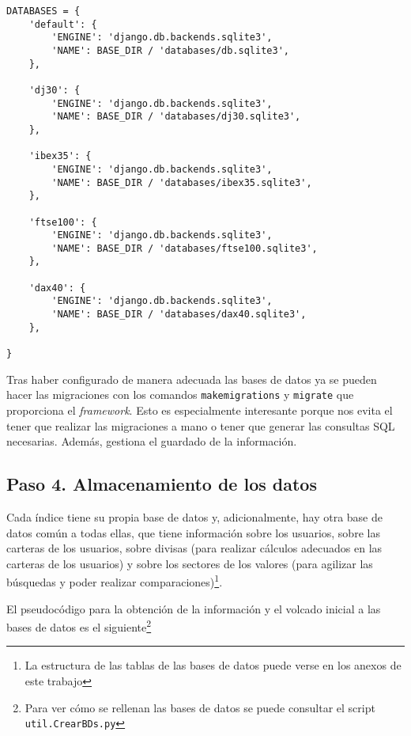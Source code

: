 \begin{verbatim}
DATABASES = {
    'default': {
        'ENGINE': 'django.db.backends.sqlite3',
        'NAME': BASE_DIR / 'databases/db.sqlite3',
    },

    'dj30': {
        'ENGINE': 'django.db.backends.sqlite3',
        'NAME': BASE_DIR / 'databases/dj30.sqlite3',
    },

    'ibex35': {
        'ENGINE': 'django.db.backends.sqlite3',
        'NAME': BASE_DIR / 'databases/ibex35.sqlite3',
    },

    'ftse100': {
        'ENGINE': 'django.db.backends.sqlite3',
        'NAME': BASE_DIR / 'databases/ftse100.sqlite3',
    },

    'dax40': {
        'ENGINE': 'django.db.backends.sqlite3',
        'NAME': BASE_DIR / 'databases/dax40.sqlite3',
    },
    
}
\end{verbatim}

Tras haber configurado de manera adecuada las bases de datos ya se pueden hacer las migraciones con los comandos \texttt{makemigrations} y \texttt{migrate} que proporciona el \emph{framework}. Esto es especialmente interesante porque nos evita el tener que realizar las migraciones a mano o tener que generar las consultas SQL necesarias. Además, gestiona el guardado de la información. 

\subsection{Paso 4. Almacenamiento de los datos}

Cada índice tiene su propia base de datos y, adicionalmente, hay otra base de datos común a todas ellas, que tiene información sobre los usuarios, sobre las carteras de los usuarios, sobre divisas (para realizar cálculos adecuados en las carteras de los usuarios) y sobre los sectores de los valores (para agilizar las búsquedas y poder realizar comparaciones)\footnote{La estructura de las tablas de las bases de datos puede verse en los anexos de este trabajo}. 

El pseudocódigo para la obtención de la información y el volcado inicial a las bases de datos es el siguiente\footnote{Para ver cómo se rellenan las bases de datos se puede consultar el script \texttt{util.CrearBDs.py}}

